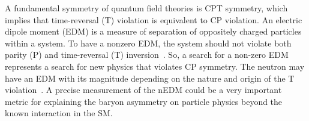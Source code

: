 A fundamental symmetry of quantum field theories is CPT symmetry, which implies that time-reversal (T) violation is equivalent to CP violation.  An electric dipole moment (EDM) is a measure of separation of oppositely charged particles within a system. To have a nonzero EDM, the system should not violate both parity (P) and time-reversal (T) inversion~\cite{edm_reason}. So, a search for a non-zero EDM represents a search for new physics that violates CP symmetry. The neutron may have an EDM with its magnitude depending on the nature and origin of the T violation~\cite{nEDM_reason}. A precise measurement of the nEDM could be a very important metric for explaining the baryon asymmetry on particle physics beyond the known interaction in the SM. 



